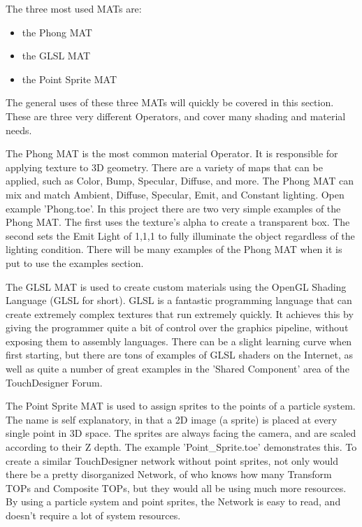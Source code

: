 \begin{fullwidth}

The three most used MATs are:

\begin{itemize}
\item the Phong MAT
\item the GLSL MAT
\item the Point Sprite MAT
\end{itemize}

The general uses of these three MATs will quickly be covered in this section. These are three very different Operators, and cover many shading and material needs.

The Phong MAT is the most common material Operator. It is responsible for applying texture to 3D geometry. There are a variety of maps that can be applied, such as Color, Bump, Specular, Diffuse, and more. The Phong MAT can mix and match Ambient, Diffuse, Specular, Emit, and Constant lighting. Open example 'Phong.toe'. In this project there are two very simple examples of the Phong MAT. The first uses the texture's alpha to create a transparent box. The second sets the Emit Light of 1,1,1 to fully illuminate the object regardless of the lighting condition. There will be many examples of the Phong MAT when it is put to use the examples section.

The GLSL MAT is used to create custom materials using the OpenGL Shading Language (GLSL for short). GLSL is a fantastic programming language that can create extremely complex textures that run extremely quickly. It achieves this by giving the programmer quite a bit of control over the graphics pipeline, without exposing them to assembly languages. There can be a slight learning curve when first starting, but there are tons of examples of GLSL shaders on the Internet, as well as quite a number of great examples in the 'Shared Component' area of the TouchDesigner Forum.

The Point Sprite MAT is used to assign sprites to the points of a particle system. The name is self explanatory, in that a 2D image (a sprite) is placed at every single point in 3D space. The sprites are always facing the camera, and are scaled according to their Z depth. The example 'Point\_Sprite.toe' demonstrates this. To create a similar TouchDesigner network without point sprites, not only would there be a pretty disorganized Network, of who knows how many Transform TOPs and Composite TOPs, but they would all be using much more resources. By using a particle system and point sprites, the Network is easy to read, and doesn't require a lot of system resources.
\end{fullwidth}


